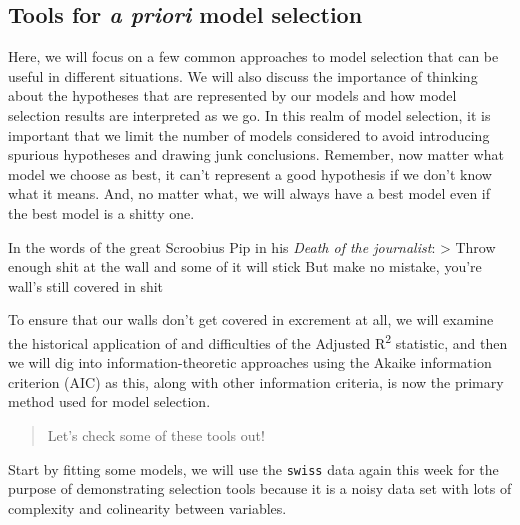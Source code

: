 \documentclass[
]{book}
\begin{document}
\hypertarget{tools-for-a-priori-model-selection}{%
\subsection{\texorpdfstring{Tools for \emph{a priori} model selection}{Tools for a priori model selection}}\label{tools-for-a-priori-model-selection}}

Here, we will focus on a few common approaches to model selection that can be useful in different situations. We will also discuss the importance of thinking about the hypotheses that are represented by our models and how model selection results are interpreted as we go. In this realm of model selection, it is important that we limit the number of models considered to avoid introducing spurious hypotheses and drawing junk conclusions. Remember, now matter what model we choose as best, it can't represent a good hypothesis if we don't know what it means. And, no matter what, we will always have a best model even if the best model is a shitty one.

In the words of the great Scroobius Pip in his \emph{Death of the journalist}:
\textgreater{} Throw enough shit at the wall and some of it will stick
But make no mistake, you're wall's still covered in shit

To ensure that our walls don't get covered in excrement at all, we will examine the historical application of and difficulties of the Adjusted R\textsuperscript{2} statistic, and then we will dig into information-theoretic approaches using the Akaike information criterion (AIC) as this, along with other information criteria, is now the primary method used for model selection.

\begin{quote}
Let's check some of these tools out!
\end{quote}

Start by fitting some models, we will use the \texttt{swiss} data again this week for the purpose of demonstrating selection tools because it is a noisy data set with lots of complexity and colinearity between variables.
\end{document}
